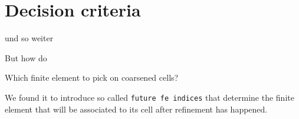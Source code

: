 \section{Decision criteria}
\label{sec:decision}

\cite{melenk2001} \cite{ainsworth1998} und so weiter

But how do

Which finite element to pick on coarsened cells?

We found it to introduce so called \texttt{future fe indices} that determine the finite element that will be associated to its cell after refinement has happened.
